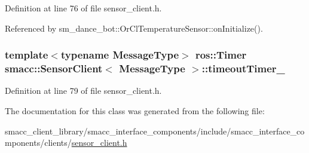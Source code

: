 Definition at line 76 of file sensor\+\_\+client.\+h.



Referenced by sm\+\_\+dance\+\_\+bot\+::\+Or\+Cl\+Temperature\+Sensor\+::on\+Initialize().

\subsubsection[{\texorpdfstring{timeout\+Timer\+\_\+}{timeoutTimer_}}]{\setlength{\rightskip}{0pt plus 5cm}template$<$typename Message\+Type$>$ ros\+::\+Timer {\bf smacc\+::\+Sensor\+Client}$<$ Message\+Type $>$\+::timeout\+Timer\+\_\+\hspace{0.3cm}{\ttfamily [private]}}\hypertarget{classsmacc_1_1SensorClient_a5a82e2fa1f0ccfe2564125fae2f9783a}{}\label{classsmacc_1_1SensorClient_a5a82e2fa1f0ccfe2564125fae2f9783a}


Definition at line 79 of file sensor\+\_\+client.\+h.



The documentation for this class was generated from the following file\+:\begin{DoxyCompactItemize}
\item 
smacc\+\_\+client\+\_\+library/smacc\+\_\+interface\+\_\+components/include/smacc\+\_\+interface\+\_\+components/clients/\hyperlink{sensor__client_8h}{sensor\+\_\+client.\+h}\end{DoxyCompactItemize}
